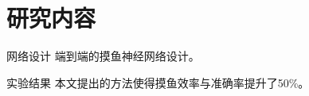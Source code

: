 
\section{研究内容}
\label{sec:content}

\begin{comment}
讲解自己的详细工作要突出思路和重点。
不一定在语言表达上涉及太多细节，比如，用过多公式讲解他人的工作步骤应避免，属于自己的工作要在视觉和语言上进行标注和区别。实验结果的表示要精炼，让人容易理解。
对比试验要公平，有说服力，对比对象要新，要有对比意义，从而体现自己的工作价值（这是研究方法和论文写作阶段都有的问题，但是答辩时常被质问）。
讲解包含可能的额外演示。
\end{comment}

\begin{frame}{网络设计}
端到端的摸鱼神经网络设计。
\end{frame}

\begin{frame}{实验结果}
本文提出的方法使得摸鱼效率与准确率提升了50\%。
\end{frame}

